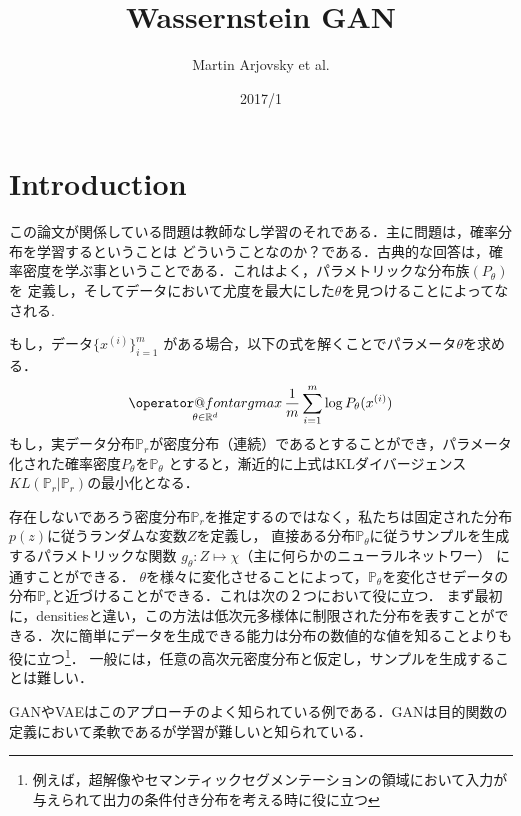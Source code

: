 \documentclass[uplatex, dvipdfmx]{jsarticle}
\title{Wassernstein GAN}
\author{Martin Arjovsky et al.}
\date{2017/1}
\makeatletter
\theoremstyle{definition}
\def\argmax{\mathop{\operator@font argmax}\limits}
\makeatother
\begin{document}
    \maketitle
    \abovedisplayskip=10.0pt%
    \belowdisplayskip=10.0pt%

    \section{Introduction}
    この論文が関係している問題は教師なし学習のそれである．主に問題は，確率分布を学習するということは
    どういうことなのか？である．古典的な回答は，確率密度を学ぶ事ということである．これはよく，パラメトリックな分布族$(P_{\theta})$を
    定義し，そしてデータにおいて尤度を最大にした$\theta$を見つけることによってなされる.

    もし，データ$\{x^{(i)}\}_{i=1}^{m}$ がある場合，以下の式を解くことでパラメータ$\theta$を求める．
    \begin{equation}
        \argmax_{\theta \in \mathbb{R}^{d}} \frac{1}{m} \sum_{i=1}^{m} \log P_{\theta}(x^{(i)})        
    \end{equation}
    もし，実データ分布$\mathbb{P}_{r}$が密度分布（連続）であるとすることができ，パラメータ化された確率密度$P_{\theta}$を$\mathbb{P}_{\theta}$
    とすると，漸近的に上式はKLダイバージェンス$KL(\mathbb{P}_{r} | \mathbb{P}_{r})$の最小化となる．
    
    存在しないであろう密度分布$\mathbb{P}_r$を推定するのではなく，私たちは固定された分布$p(z)$に従うランダムな変数$Z$を定義し，
    直接ある分布$\mathbb{P}_{\theta}$に従うサンプルを生成するパラメトリックな関数 $g_{\theta}: Z  \longmapsto \chi$（主に何らかのニューラルネットワー）
    に通すことができる．
    $\theta$を様々に変化させることによって，$\mathbb{P}_{\theta}$を変化させデータの分布$\mathbb{P}_{r}$と近づけることができる．これは次の２つにおいて役に立つ．
    まず最初に，densitiesと違い，この方法は低次元多様体に制限された分布を表すことができる．次に簡単にデータを生成できる能力は分布の数値的な値を知ることよりも
    役に立つ\footnote{例えば，超解像やセマンティックセグメンテーションの領域において入力が与えられて出力の条件付き分布を考える時に役に立つ}．
    一般には，任意の高次元密度分布と仮定し，サンプルを生成することは難しい\cite{Radford}．

    GANやVAEはこのアプローチのよく知られている例である．GANは目的関数の定義において柔軟であるが学習が難しいと知られている．
\end{document}
